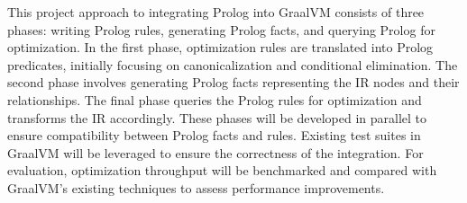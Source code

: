 This project approach to integrating Prolog into GraalVM consists of three phases: writing Prolog rules, generating Prolog facts, and querying Prolog for optimization. In the first phase, optimization rules are translated into Prolog predicates, initially focusing on canonicalization and conditional elimination. The second phase involves generating Prolog facts representing the IR nodes and their relationships. The final phase queries the Prolog rules for optimization and transforms the IR accordingly. These phases will be developed in parallel to ensure compatibility between Prolog facts and rules. Existing test suites in GraalVM will be leveraged to ensure the correctness of the integration. For evaluation, optimization throughput will be benchmarked and compared with GraalVM’s existing techniques to assess performance improvements.